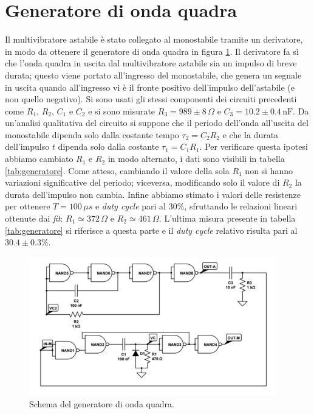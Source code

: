 \documentclass[10pt,a4paper]{article}
\begin{document}
\section{Generatore di onda quadra}
Il multivibratore astabile è stato collegato al monostabile tramite un derivatore, in modo da ottenere il generatore di onda quadra in figura \ref{fig:generatorequadra}. Il derivatore fa sì che l'onda quadra in uscita dal multivibratore astabile sia un impulso di breve durata; questo viene portato all'ingresso del monostabile, che genera un segnale in uscita quando all'ingresso vi è il fronte positivo dell'impulso dell'astabile (e non quello negativo). Si sono usati gli stessi componenti dei circuiti precedenti come $R_1$, $R_2$, $C_1$ e $C_2$ e si sono misurate $R_3=989\pm8\,\Omega$ e $C_3= 10.2\pm0.4 \,\text{nF}$. Da un'analisi qualitativa del circuito si suppone che il periodo dell'onda all'uscita del monostabile dipenda solo dalla costante tempo $\tau_2=C_2R_2$ e che la durata dell'impulso $t$ dipenda solo dalla costante $\tau_1=C_1R_1$. Per verificare questa ipotesi abbiamo cambiato $R_1$ e $R_2$ in modo alternato, i dati sono visibili in tabella \ref{tab:generatore}. Come atteso, cambiando il valore della sola $R_1$ non si hanno variazioni significative del periodo; viceversa, modificando solo il valore di $R_2$ la durata dell'impulso non cambia.
Infine abbiamo stimato i valori delle resistenze per ottenere $T=100\,\mu s$ e \emph{duty cycle} pari al $30\%$, sfruttando le relazioni lineari ottenute dai \emph{fit}: $R_1\simeq 372\,\Omega $ e $R_2 \simeq 461\,\Omega$. L'ultima misura presente in tabella \ref{tab:generatore} si riferisce a questa parte e il \emph{duty cycle} relativo risulta pari al $30.4\pm0.3\%$.









\begin{figure}[!htb]
  \centering
  \includegraphics[scale=0.9]{generatorequadra.png}
\caption{Schema del generatore di onda quadra.\label{fig:generatorequadra}}
\end{figure}
\end{document}
